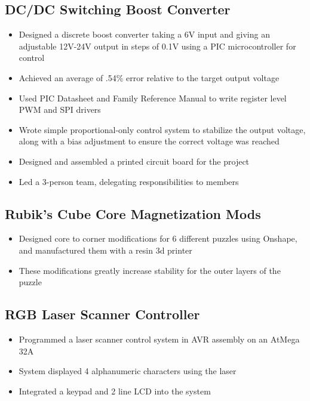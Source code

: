 \documentclass{article}
\begin{document}
\begin{spacing}{.5}
	\subsection{DC/DC Switching Boost Converter \hfill {}}
		\begin{itemize}[label=--,itemsep=-.35ex]
			\item \large{Designed a discrete boost converter taking a 6V input and giving an adjustable 12V-24V output in steps of 0.1V using a PIC microcontroller for control}
			\item \large{Achieved an average of .54\% error relative to the target output voltage}
			\item \large{Used PIC Datasheet and Family Reference Manual to write register level PWM and SPI drivers}
			\item \large{Wrote simple proportional-only control system to stabilize the output voltage, along with a bias adjustment to ensure the correct voltage was reached}
			\item \large{Designed and assembled a printed circuit board for the project}
			\item \large{Led a 3-person team, delegating responsibilities to members}
		\end{itemize}
	\subsection{Rubik's Cube Core Magnetization Mods \hfill {}}
		\begin{itemize}[label=--,itemsep=-.35ex]
			\item \large{Designed core to corner modifications for 6 different puzzles using Onshape, and manufactured them with a resin 3d printer}
			\item \large{These modifications greatly increase stability for the outer layers of the puzzle}
		\end{itemize}
	\subsection{RGB Laser Scanner Controller \hfill {}}
		\begin{itemize}[label=--,itemsep=-.35ex]
			\item \large{Programmed a laser scanner control system in AVR assembly on an AtMega 32A}
			\item \large{System displayed 4 alphanumeric characters using the laser}
			\item \large{Integrated a keypad and 2 line LCD into the system}
		\end{itemize}


\end{spacing}
\end{document}
